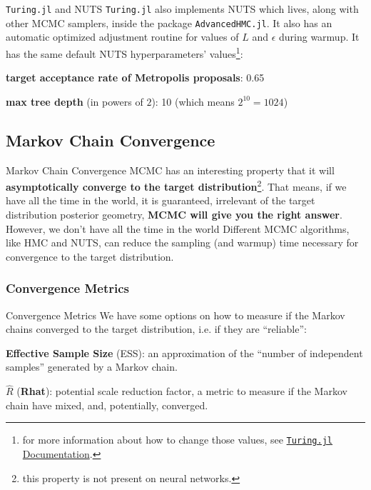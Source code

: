 \begin{frame}{\texttt{Turing.jl} and NUTS}
	\texttt{Turing.jl} also implements NUTS which lives, along with other MCMC samplers, inside the package \texttt{AdvancedHMC.jl}.
	It also has an automatic optimized adjustment routine for values of $L$ and $\epsilon$ during warmup.
	It has the same default NUTS hyperparameters' values\footnote{
		for more information about how to change those values, see \href{
			https://turing.ml/dev/docs/library}{
			\texttt{Turing.jl} Documentation}.}:
	\begin{vfilleditems}
		\item \textbf{target acceptance rate of Metropolis proposals}: 0.65
		\item \textbf{max tree depth} (in powers of $2$): 10 (which means $2^{10} = 1024$)
	\end{vfilleditems}
\end{frame}

\subsection{Markov Chain Convergence}
\begin{frame}{Markov Chain Convergence}
	MCMC has an interesting property that it will
	\textbf{asymptotically converge to the target distribution}\footnote{
		this property is not present on neural networks.}.
	\vfill
	That means, if we have all the time in the world, it is guaranteed,
	irrelevant of the target distribution posterior geometry,
	\textbf{MCMC will give you the right answer}.
	\vfill
	However, we don't have all the time in the world
	Different MCMC algorithms, like HMC and NUTS,
	can reduce the sampling (and warmup) time necessary for convergence to the target distribution.
\end{frame}

\subsubsection{Convergence Metrics}
\begin{frame}{Convergence Metrics}
	We have some options on how to measure if the Markov chains converged to the target distribution,
	i.e. if they are ``reliable'':
	\begin{vfilleditems}
		\item \textbf{Effective Sample Size} (ESS):
		an approximation of the ``number of independent samples'' generated by a Markov chain.
		\item $\widehat{R}$ (\textbf{Rhat}):
		potential scale reduction factor,
		a metric to measure if the Markov chain have mixed,
		and, potentially, converged.
	\end{vfilleditems}
\end{frame}

